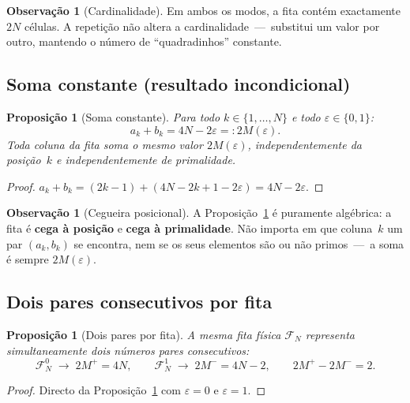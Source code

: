 \documentclass[12pt, a4paper]{article}
\theoremstyle{plain}
\newtheorem{proposition}[theorem]{Proposição}
\theoremstyle{definition}
\newtheorem{remark}[theorem]{Observação}
\theoremstyle{remark}
\begin{document}
	\begin{remark}[Cardinalidade]
		Em ambos os modos, a fita contém exactamente $2N$ células.
		A repetição não altera a cardinalidade~---~substitui um valor por
		outro, mantendo o número de ``quadradinhos'' constante.
	\end{remark}
	
	\subsection{Soma constante (resultado incondicional)}
	
	\begin{proposition}[Soma constante]
		\label{prop:soma}
		Para todo $k\in\{1,\dots,N\}$ e todo $\varepsilon\in\{0,1\}$:
		\[
		a_k + b_k = 4N - 2\varepsilon =: 2M(\varepsilon).
		\]
		Toda coluna da fita soma o mesmo valor $2M(\varepsilon)$,
		independentemente da posição~$k$ e independentemente de
		primalidade.
	\end{proposition}
	
	\begin{proof}
		$a_k+b_k = (2k-1)+(4N-2k+1-2\varepsilon) = 4N-2\varepsilon$.
	\end{proof}
	
	\begin{remark}[Cegueira posicional]
		A Proposição~\ref{prop:soma} é puramente algébrica: a fita é
		\textbf{cega à posição} e \textbf{cega à primalidade}.  Não
		importa em que coluna~$k$ um par $(a_k,b_k)$ se encontra, nem se
		os seus elementos são ou não primos~---~a soma é sempre
		$2M(\varepsilon)$.
	\end{remark}
	
	\subsection{Dois pares consecutivos por fita}
	
	\begin{proposition}[Dois pares por fita]
		\label{prop:dois}
		A mesma fita física $\mathcal{F}_N$ representa simultaneamente
		dois números pares consecutivos:
		\[
		\mathcal{F}_N^0 \;\longrightarrow\; 2M^+ = 4N,
		\qquad
		\mathcal{F}_N^1 \;\longrightarrow\; 2M^- = 4N-2,
		\qquad
		2M^+ - 2M^- = 2.
		\]
	\end{proposition}
	
	\begin{proof}
		Directo da Proposição~\ref{prop:soma} com $\varepsilon=0$ e
		$\varepsilon=1$.
	\end{proof}
	
\end{document}
